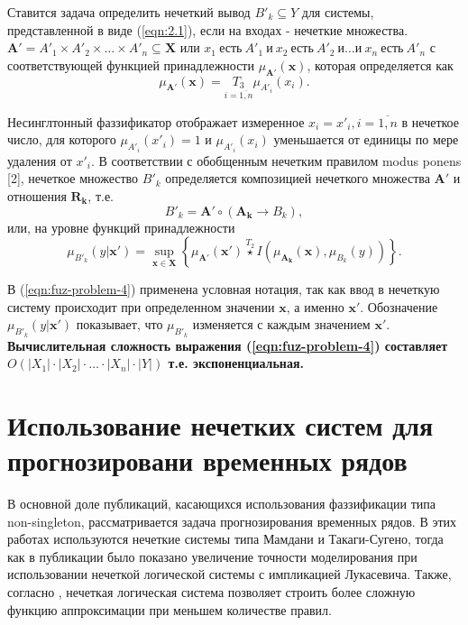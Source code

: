 Ставится задача определить нечеткий вывод $B'_k \subseteq Y$ для системы, представленной в виде (\ref{eqn:2.1}), если на входах - нечеткие множества.
$\mathbf{A'}=A'_1 \times A'_2 \times \dots \times A'_n \subseteq \mathbf{X}$ или $x_1\ \text{есть}\ A'_1\ \text{и}\ x_2\ \text{есть}\ A'_2\ \text{и} \dots \text{и}\ x_n\ \text{есть}\ A'_n$  с соответствующей функцией принадлежности $\mu_{\mathbf{A'}}(\mathbf{x})$, которая определяется как
\begin{equation}
	\label{eqn:fuz-problem-3}
	\mu_{\mathbf{A'}}(\mathbf{x}) = \underset{i=\overline{1,n}}{T_3} \mu_{A'_i}(x_i).
\end{equation}

Несинглтонный фаззификатор отображает измеренное $x_i=x'_i, i=\overline{1,n}$ в нечеткое число, для которого $\mu_{A'_i}(x'_i) = 1$ и $\mu_{A'_i}(x_i)$ уменьшается от единицы по мере удаления от  $x'_i$.
В соответствии с обобщенным нечетким правилом modus ponens [2], нечеткое множество $B'_k$ определяется композицией нечеткого множества $\mathbf{A'}$ и отношения $\mathbf{R_k}$, т.е.
\[
B'_k = \mathbf{A'} \circ (\mathbf{A_k} \to B_k),
\]
или, на уровне функций принадлежности
\begin{equation}
	\label{eqn:fuz-problem-4}
	\mu_{B'_k}(y|\mathbf{x'}) = \sup_{\mathbf{x}\in \mathbf{X}}\left\{\mu_{\mathbf{A'}}(\mathbf{x'})\overset{T_2}{\star} I(\mu_{\mathbf{A_k}}(\mathbf{x}), \mu_{B_k}(y))\right\}.
\end{equation}

В (\ref{eqn:fuz-problem-4}) применена условная нотация, так как ввод в нечеткую систему происходит при определенном значении $\mathbf{x}$, а именно $\mathbf{x'}$. Обозначение $\mu_{B'_k}(y | \mathbf{x'})$ показывает, что $\mu_{B'_k}$ изменяется с каждым значением $\mathbf{x'}$. \textbf{Вычислительная сложность выражения (\ref{eqn:fuz-problem-4}) составляет $O(|X_1|\cdot |X_2|\cdot \dots \cdot |X_n|\cdot |Y|)$ т.е. экспоненциальная.}

\section{Использование нечетких систем для прогнозировани временных рядов}

В основной доле публикаций, касающихся использования фаззификации типа non-singleton, рассматривается задача прогнозирования временных рядов. В этих работах используются нечеткие системы типа Мамдани и Такаги-Сугено, тогда как в публикации {} было показано увеличение точности моделирования при использовании нечеткой логической системы с импликацией Лукасевича. Также, согласно , нечеткая логическая система позволяет строить более сложную функцию аппроксимации при меньшем количестве правил. 

